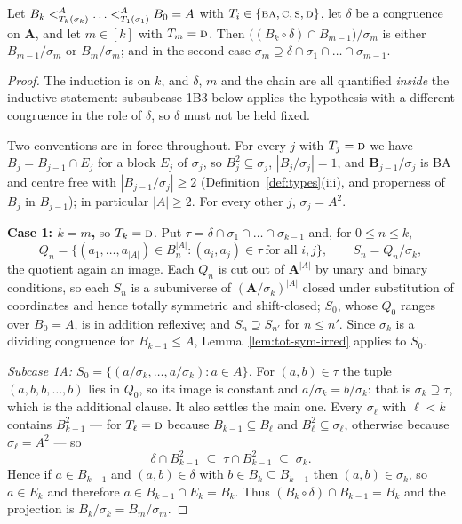 \begin{longlemma}\label{lem:self-intersection-pc}
Let $B_{k}\subt[A]{T_{k}(\sigma_{k})}\dots\subt[A]{T_{1}(\sigma_{1})}B_{0}=A$
with $T_{i}\in\{\textup{\textsc{ba}},\textup{\textsc{c}},\textup{\textsc{s}},\textup{\textsc{d}}\}$, let $\delta$ be a congruence on
$\mathbf A$, and let $m\in[k]$ with $T_{m}=\textup{\textsc{d}}$. Then
$\bigl((B_{k}\circ\delta)\cap B_{m-1}\bigr)/\sigma_{m}$ is either
$B_{m-1}/\sigma_{m}$ or $B_{m}/\sigma_{m}$; and in the second case
$\sigma_{m}\supseteq\delta\cap\sigma_{1}\cap\dots\cap\sigma_{m-1}$.
\end{longlemma}

\begin{proof}
The induction is on $k$, and $\delta$, $m$ and the chain are all quantified
\emph{inside} the inductive statement: subsubcase 1B3 below applies the
hypothesis with a different congruence in the role of $\delta$, so $\delta$ must
not be held fixed.

Two conventions are in force throughout. For every $j$ with $T_{j}=\textup{\textsc{d}}$ we have
$B_{j}=B_{j-1}\cap E_{j}$ for a block $E_{j}$ of $\sigma_{j}$, so
$B_{j}^{2}\subseteq\sigma_{j}$, $|B_{j}/\sigma_{j}|=1$, and
$\mathbf B_{j-1}/\sigma_{j}$ is BA and centre free with
$|B_{j-1}/\sigma_{j}|\ge2$ (Definition~\ref{def:types}(iii), and properness of
$B_{j}$ in $B_{j-1}$); in particular $|A|\ge2$. For every other $j$,
$\sigma_{j}=A^{2}$.

\medskip\noindent\textbf{Case 1: $k=m$,} so $T_{k}=\textup{\textsc{d}}$. Put
$\tau=\delta\cap\sigma_{1}\cap\dots\cap\sigma_{k-1}$ and, for
$0\le n\le k$,
\[
  Q_{n}=\bigl\{(a_{1},\dots,a_{|A|})\in B_{n}^{|A|}:
    (a_{i},a_{j})\in\tau\ \text{for all }i,j\bigr\},
  \qquad S_{n}=Q_{n}/\sigma_{k},
\]
the quotient again an image. Each $Q_{n}$ is cut out of $\mathbf A^{|A|}$ by
unary and binary conditions, so each $S_{n}$ is a subuniverse of
$(\mathbf A/\sigma_{k})^{|A|}$ closed under substitution of coordinates and
hence totally symmetric and shift-closed;
$S_{0}$, whose $Q_{0}$ ranges over $B_{0}=A$, is in addition reflexive; and
$S_{n}\supseteq S_{n'}$ for $n\le n'$. Since $\sigma_{k}$ is a dividing
congruence for $B_{k-1}\le A$, Lemma~\ref{lem:tot-sym-irred} applies to
$S_{0}$.

\emph{Subcase 1A: $S_{0}=\{(a/\sigma_{k},\dots,a/\sigma_{k}):a\in A\}$.} For
$(a,b)\in\tau$ the tuple $(a,b,b,\dots,b)$ lies in $Q_{0}$, so its image is
constant and $a/\sigma_{k}=b/\sigma_{k}$: that is
$\sigma_{k}\supseteq\tau$, which is the additional clause. It also settles the
main one. Every $\sigma_{\ell}$ with $\ell<k$ contains $B_{k-1}^{2}$ --- for
$T_{\ell}=\textup{\textsc{d}}$ because $B_{k-1}\subseteq B_{\ell}$ and
$B_{\ell}^{2}\subseteq\sigma_{\ell}$, otherwise because
$\sigma_{\ell}=A^{2}$ --- so
\[
  \delta\cap B_{k-1}^{2}\;\subseteq\;\tau\cap B_{k-1}^{2}\;\subseteq\;\sigma_{k}.
\]
Hence if $a\in B_{k-1}$ and $(a,b)\in\delta$ with $b\in B_{k}\subseteq B_{k-1}$
then $(a,b)\in\sigma_{k}$, so $a\in E_{k}$ and therefore
$a\in B_{k-1}\cap E_{k}=B_{k}$. Thus
$(B_{k}\circ\delta)\cap B_{k-1}=B_{k}$ and the projection is
$B_{k}/\sigma_{k}=B_{m}/\sigma_{m}$.


\end{proof}
